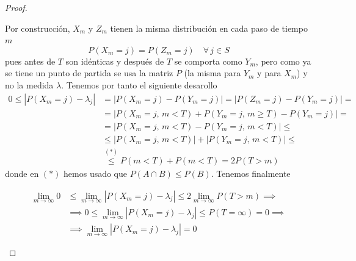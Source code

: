 \begin{teo}
\begin{proof}
\begin{description}
        \noindent Por construcción, $X_m$ y $Z_m$ tienen la misma distribución en cada paso de tiempo $m$
        $$P(X_m = j) = P(Z_m = j) \quad \forall \, j \in S$$
        pues antes de $T$ son idénticas y después de $T$ se comporta como $Y_m$, pero como ya se tiene un punto de partida se usa la matriz $P$ (la misma para $Y_m$ y para $X_m$) y no la medida $\lambda$. Tenemos por tanto el siguiente desarollo
        \begin{align*}
            0\le \left| P(X_m = j) - \lambda_j \right| &= \left| P(X_m = j) - P(Y_m = j) \right| = \left| P(Z_m = j) - P(Y_m = j) \right| = \\
            &= \left| P(X_m = j, \, m < T) + P(Y_m = j, \, m \ge T) - P(Y_m = j) \right| = \\
            &= \left| P(X_m = j, \, m < T) - P(Y_m = j, \, m < T) \right| \le \\
            &\le \left| P(X_m = j, \, m < T) \right| + \left| P(Y_m = j, \, m < T) \right| \le \\
            &\overset{(*)}{\le} P(m < T) + P(m < T) = 2P(T > m)
        \end{align*}
        donde en $(*)$ hemos usado que $P(A \cap B) \le P(B)$. Tenemos finalmente


        \begin{align*}
            \lim_{m \to \infty} 0 &\le \lim_{m \to \infty} \left| P(X_m = j) - \lambda_j \right| \le 2 \lim_{m \to \infty} P(T > m) \implies \\
            &\implies  0\le \lim_{m \to \infty} \left| P(X_m = j) - \lambda_j \right| \le P(T = \infty) = 0 \implies \\
            &\implies \lim_{m \to \infty} \left| P(X_m = j) - \lambda_j \right| = 0
        \end{align*}

\end{description}
\end{proof}
\end{teo}


